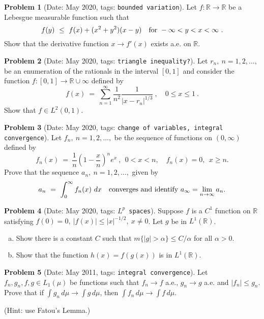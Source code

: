 \documentclass[11pt, notitlepage]{article}
\theoremstyle{definition}
\theoremstyle{definition}
\theoremstyle{definition}
\newtheorem{probstate}{Problem}
\theoremstyle{remark}
\newenvironment{problem}[2]{
    \begin{probstate}[Date: #1, tags: \texttt{#2}]
}
{
  \end{probstate}
}
\begin{document}
\begin{problem}{May 2020}{bounded variation}
  Let $f:\mathbb{R}\to\mathbb{R}$ be a Lebesgue measurable function such that
$$
f(y) \ \le \ f(x)+(x^2+y^2)(x-y) \quad {\rm for \ } -\infty<y<x<\infty \ .
$$
Show that the derivative function $x\to f'(x)$ exists a.e. on $\mathbb{R}$.
\end{problem}

\begin{problem}{May 2020}{triangle inequality?}
  Let $r_n, \ n=1,2,\ldots,$ be an enumeration of the rationals in the interval $[0,1]$ and consider the function  $f:[0,1]\to\mathbb{R}\cup{\infty}$ defined by
$$
f(x) \ = \ \sum_{n=1}^\infty \frac{1}{n^2}\frac{1}{|x-r_n|^{1/3}} \ , \quad 0\le x\le 1 \ .
$$
Show that $f\in L^2(0,1)$.
\end{problem}

\begin{problem}{May 2020}{change of variables, integral convergence}
  Let $f_n, \ n=1,2,...,$ be the sequence of functions on $(0,\infty)$ defined by
$$
f_n(x) \ = \ \frac{1}{n}\left(1-\frac{x}{n}\right)^n e^{x} \ ,  \ \ 0<x<n, \quad f_n(x)=0, \ \ x\ge n.
$$
Prove that the sequence $a_n, \ n=1,2,\dots,$ given by
$$
a_n \ = \ \int_0^\infty f_n(x) \ dx \quad {\rm converges \ and \ identify \ } a_\infty=\lim_{n\to\infty} a_n.
$$
\end{problem}

\begin{problem}{May 2020}{$L^p$ spaces}
Suppose $f$ is a $C^1$ function on $\mathbb{R}$ satisfying $f(0)=0, \ |f(x)|\le |x|^{-1/2}, \ x\ne 0$. Let $g$ be in  $L^1(\mathbb{R})$.
\begin{enumerate}[(a)]
\item Show there is a constant $C$ such that $m\{|g|>\alpha\}\le C/\alpha$ for all $\alpha>0$.

\item Show that the function $h(x)=f(g(x))$ is in $L^1(\mathbb{R})$.
\end{enumerate}
\end{problem}

\begin{problem}{May 2011}{integral convergence}
  Let $f_n,g_n,f,g \in L_1(\mu)$ be functions such that
    $f_n \to f$ a.e., $g_n \to g$ a.e. and $|f_n| \le g_n$. Prove
    that if $\int g_n \, d \mu \to \int g \, d \mu$, then
    $\int f_n \, d \mu \to \int f \, d \mu$.

    (Hint: use Fatou's Lemma.)
\end{problem}
\end{document}
